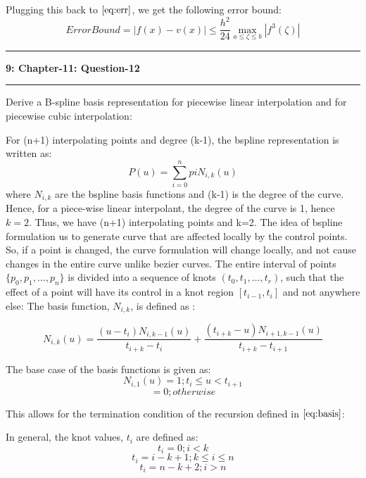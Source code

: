 \documentclass{article}
\newcommand\question[2]{\vspace{.25in}\hrule\textbf{#1: #2}\hrule\vspace{.10in}}
\begin{document}
 Plugging this back to $\eqref{eq:err}$, we get the following error bound: \newline
 \[ ErrorBound = |f(x) - v(x)| \leq \dfrac{h^2}{24} \max_{a \leq \zeta \leq b} |f^3(\zeta)|\]








 \question{9}{Chapter-11: Question-12}
Derive a B-spline basis representation for piecewise linear interpolation and for piecewise cubic interpolation: \newline

For (n+1) interpolating  points and degree (k-1), the bspline representation is written as: \newline
\begin{equation}
  P(u) = \sum_{i=0}^n pi N_{i,k}(u)
  \label{eq:bsum}
\end{equation}
 where $N_{i,k}$ are the bspline basis functions and (k-1) is the degree of the curve. Hence, for a piece-wise linear interpolant, the degree of the curve is 1, hence $k=2$. Thus, we have (n+1) interpolating points and k=2. \newline
The idea of bspline formulation us to  generate curve that are affected locally by the control points. So, if a point is changed, the curve formulation will change locally, and not cause changes in the entire curve unlike bezier curves. The entire interval of points $\{ p_0, p_1, \dots, p_n\}$ is divided into a sequence of knots $(t_0, t_1, \dots, t_r)$, such that the effect of a point will have its control in a knot region $[t_{i-1}, t_i]$ and not anywhere else: \newline
The basis function, $N_{i,k}$, is defined as :\newline

\begin{equation}
   N_{i,k}(u) = \dfrac{(u - t_i) N_{i,k-1}(u)}{t_{i+k} - t_i} + \dfrac{(t_{i+k} - u)N_{i+1,k-1}(u)}{t_{i+k} - t_{i+1}}
  \label{eq:basis}
\end{equation}

The base case of the basis functions is given as:
\[ N_{i,1}(u) = 1; t_i \leq u < t_{i+1}\]
\[ = 0 ; otherwise\]

This allows for the termination condition of the recursion defined in $\eqref{eq:basis}$: \newline

In general, the knot values, $t_i$ are defined as: \newline
\[ t_i = 0; i < k\]
\[ t_i = i-k+1; k \leq i \leq n\]
\[ t_i = n-k+2; i > n\]
\end{document}
